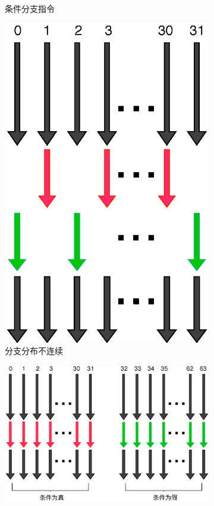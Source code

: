\begin{figure}
\begin{fullwidth}
\begin{subfigure}[b]{0.24\thewidth}
		\caption{条件分支指令}
	\end{subfigure}
	\begin{subfigure}[b]{0.24\thewidth}
		\includegraphics[width=1.\textwidth]{figures/rp/branching-2}
		\caption{分支分布不连续}
	\end{subfigure}
	\begin{subfigure}[b]{0.51\thewidth}
		\includegraphics[width=1.\textwidth]{figures/rp/branching-3}

\end{subfigure}
\end{fullwidth}
\end{figure}
